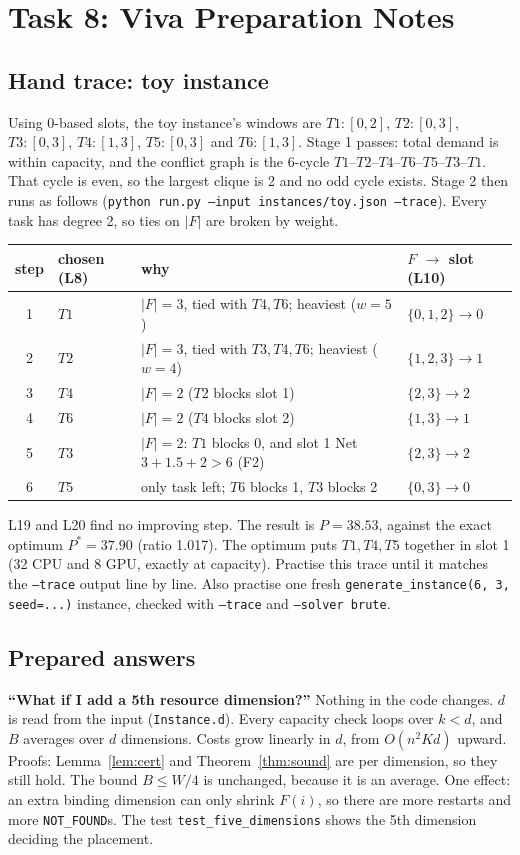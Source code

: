 \section{Task 8: Viva Preparation Notes}

\subsection{Hand trace: toy instance}
Using 0-based slots, the toy instance's windows are $T1{:}[0,2]$,
$T2{:}[0,3]$, $T3{:}[0,3]$, $T4{:}[1,3]$, $T5{:}[0,3]$ and $T6{:}[1,3]$.
Stage 1 passes: total demand is within capacity, and the conflict graph
is the 6-cycle $T1$--$T2$--$T4$--$T6$--$T5$--$T3$--$T1$. That cycle is even,
so the largest clique is 2 and no odd cycle exists. Stage 2 then runs as
follows (\texttt{python run.py --input instances/toy.json --trace}). Every
task has degree 2, so ties on $|F|$ are broken by weight.
\begin{center}\small
\begin{tabular}{c l l l}
\toprule
step & chosen (L8) & why & $F$ $\to$ slot (L10)\\
\midrule
1 & $T1$ & $|F|=3$, tied with $T4,T6$; heaviest ($w{=}5$) & $\{0,1,2\}\to0$\\
2 & $T2$ & $|F|=3$, tied with $T3,T4,T6$; heaviest ($w{=}4$) & $\{1,2,3\}\to1$\\
3 & $T4$ & $|F|=2$ ($T2$ blocks slot 1) & $\{2,3\}\to2$\\
4 & $T6$ & $|F|=2$ ($T4$ blocks slot 2) & $\{1,3\}\to1$\\
5 & $T3$ & $|F|=2$: $T1$ blocks 0, and slot 1 Net $3+1.5+2>6$ (F2) & $\{2,3\}\to2$\\
6 & $T5$ & only task left; $T6$ blocks 1, $T3$ blocks 2 & $\{0,3\}\to0$\\
\bottomrule
\end{tabular}
\end{center}
L19 and L20 find no improving step. The result is $P=38.53$, against the
exact optimum $P^\ast=37.90$ (ratio 1.017). The optimum puts $T1,T4,T5$
together in slot 1 (32 CPU and 8 GPU, exactly at capacity). Practise this
trace until it matches the \texttt{--trace} output line by line. Also
practise one fresh \texttt{generate\_instance(6, 3, seed=...)} instance,
checked with \texttt{--trace} and \texttt{--solver brute}.

\subsection{Prepared answers}
\textbf{``What if I add a 5th resource dimension?''} Nothing in the code
changes. $d$ is read from the input (\texttt{Instance.d}). Every capacity
check loops over $k<d$, and $B$ averages over $d$ dimensions. Costs grow
linearly in $d$, from $O(n^2Kd)$ upward. Proofs: Lemma~\ref{lem:cert} and
Theorem~\ref{thm:sound} are per dimension, so they still hold. The bound
$B\le W/4$ is unchanged, because it is an average. One effect: an extra
binding dimension can only shrink $F(i)$, so there are more restarts and
more \texttt{NOT\_FOUND}s. The test \texttt{test\_five\_dimensions} shows
the 5th dimension deciding the placement.

